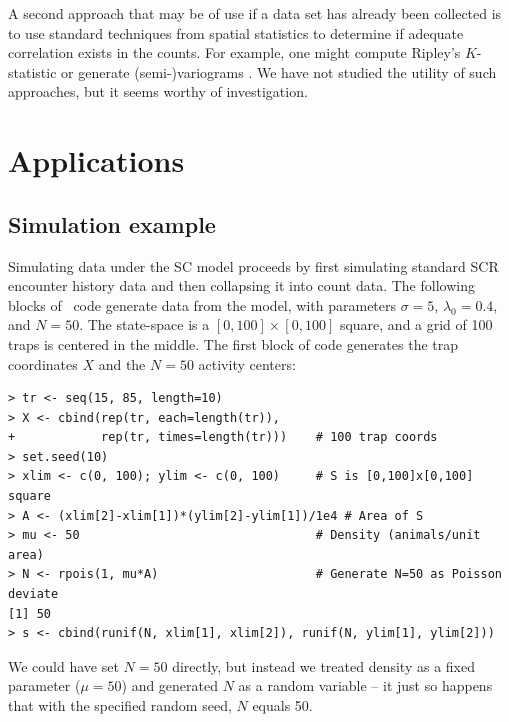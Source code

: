 A second approach that may be of use if a data set has already been
collected is to use standard techniques from spatial statistics to
determine if adequate correlation exists in the counts. For example,
one might compute Ripley's $K$-statistic or generate (semi-)variograms
\citep{illian_etal:2008}. We have not studied the utility of such
approaches, but it seems worthy of investigation.



\section{Applications}
\label{unmarked.sec.app}

\subsection{Simulation example}

Simulating data under the SC model proceeds by first simulating
standard SCR encounter history data and then collapsing it into count
data. The following blocks of \R~code generate data from
the model, %
with parameters
$\sigma=5$, $\lambda_0=0.4$, and $N=50$. The state-space is a
$[0, 100] \times [0, 100]$ square, and a grid of 100 traps
is centered in the middle.
The first block of code generates the trap coordinates
$X$ and the $N=50$ activity centers:
\begin{small}
\begin{verbatim}
> tr <- seq(15, 85, length=10)
> X <- cbind(rep(tr, each=length(tr)),
+            rep(tr, times=length(tr)))    # 100 trap coords
> set.seed(10)
> xlim <- c(0, 100); ylim <- c(0, 100)     # S is [0,100]x[0,100] square
> A <- (xlim[2]-xlim[1])*(ylim[2]-ylim[1])/1e4 # Area of S
> mu <- 50                                 # Density (animals/unit area)
> N <- rpois(1, mu*A)                      # Generate N=50 as Poisson deviate
[1] 50
> s <- cbind(runif(N, xlim[1], xlim[2]), runif(N, ylim[1], ylim[2]))
\end{verbatim}
\end{small}
We could have set $N=50$ directly, but instead we treated density
as a fixed parameter ($\mu=50$) and generated $N$ as a random
variable -- it just so happens that with the specified random seed,
$N$ equals 50. %

